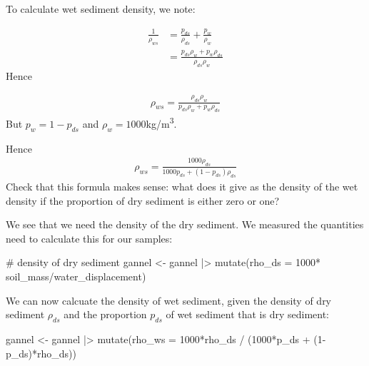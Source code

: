 \documentclass[
  letterpaper,
  DIV=11,
  numbers=noendperiod]{scrreprt}
\newenvironment{Shaded}{\begin{snugshade}}{\end{snugshade}}
\newcommand{\AttributeTok}[1]{\textcolor[rgb]{0.40,0.45,0.13}{#1}}
\newcommand{\CommentTok}[1]{\textcolor[rgb]{0.37,0.37,0.37}{#1}}
\newcommand{\DecValTok}[1]{\textcolor[rgb]{0.68,0.00,0.00}{#1}}
\newcommand{\FunctionTok}[1]{\textcolor[rgb]{0.28,0.35,0.67}{#1}}
\newcommand{\NormalTok}[1]{\textcolor[rgb]{0.00,0.23,0.31}{#1}}
\newcommand{\OtherTok}[1]{\textcolor[rgb]{0.00,0.23,0.31}{#1}}
\newcommand{\SpecialCharTok}[1]{\textcolor[rgb]{0.37,0.37,0.37}{#1}}
\begin{document}
To calculate wet sediment density, we note:

\[
\begin{align}
\frac{1}{\rho_{ws}} &= \frac{p_{ds}}{\rho_{ds}} + \frac{p_w}{\rho_w}\\
&=\frac{p_{ds}\rho_{w} + p_w\rho_{ds}}{\rho_{ds}\rho_w}
\end{align}
\] Hence

\[
\begin{align}
\rho_{ws}=\frac{\rho_{ds}\rho_w}{p_{ds}\rho_{w} + p_w\rho_{ds}}
\end{align}
\] But \(p_w = 1-p_{ds}\) and \(\rho_w=1000\)kg/m\textsuperscript{3}.

Hence \[
\begin{align}
\rho_{ws}=\frac{1000\rho_{ds}}{1000p_{ds} + (1-p_{ds})\rho_{ds}}
\end{align}
\] Check that this formula makes sense: what does it give as the density
of the wet density if the proportion of dry sediment is either zero or
one?

We see that we need the density of the dry sediment. We measured the
quantities need to calculate this for our samples:

\begin{Shaded}
\begin{Highlighting}[]
\CommentTok{\# density of dry sediment}
\NormalTok{gannel }\OtherTok{\textless{}{-}}\NormalTok{ gannel }\SpecialCharTok{|\textgreater{}}
\FunctionTok{mutate}\NormalTok{(}\AttributeTok{rho\_ds =} \DecValTok{1000}\SpecialCharTok{*}\NormalTok{ soil\_mass}\SpecialCharTok{/}\NormalTok{water\_displacement)}
\end{Highlighting}
\end{Shaded}

We can now calcuate the density of wet sediment, given the density of
dry sediment \(\rho_{ds}\) and the proportion \(p_{ds}\) of wet sediment
that is dry sediment:

\begin{Shaded}
\begin{Highlighting}[]
\NormalTok{gannel }\OtherTok{\textless{}{-}}\NormalTok{ gannel }\SpecialCharTok{|\textgreater{}}
  \FunctionTok{mutate}\NormalTok{(}\AttributeTok{rho\_ws =} \DecValTok{1000}\SpecialCharTok{*}\NormalTok{rho\_ds }\SpecialCharTok{/}\NormalTok{ (}\DecValTok{1000}\SpecialCharTok{*}\NormalTok{p\_ds }\SpecialCharTok{+}\NormalTok{ (}\DecValTok{1}\SpecialCharTok{{-}}\NormalTok{p\_ds)}\SpecialCharTok{*}\NormalTok{rho\_ds))}
\end{Highlighting}
\end{Shaded}
\end{document}
